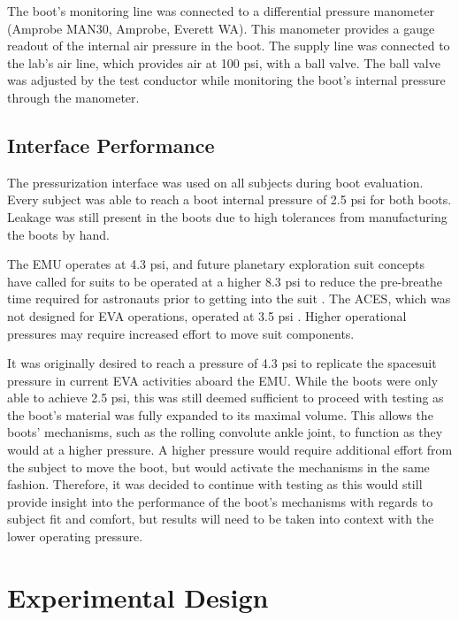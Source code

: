 \documentclass[defaultstyle,11pt]{thesis}
\begin{document}
The boot's monitoring line was connected to a differential pressure manometer (Amprobe MAN30, Amprobe, Everett WA).
This manometer provides a gauge readout of the internal air pressure in the boot.
The supply line was connected to the lab's air line, which provides air at 100 psi, with a ball valve.
The ball valve was adjusted by the test conductor while monitoring the boot's internal pressure through the manometer.

\hypertarget{interface-performance}{%
\subsection{Interface Performance}\label{interface-performance}}

The pressurization interface was used on all subjects during boot evaluation.
Every subject was able to reach a boot internal pressure of 2.5 psi for both boots.
Leakage was still present in the boots due to high tolerances from manufacturing the boots by hand.

The EMU operates at 4.3 psi, and future planetary exploration suit concepts have called for suits to be operated at a higher 8.3 psi to reduce the pre-breathe time required for astronauts prior to getting into the suit \citep{Kosmo1988}.
The ACES, which was not designed for EVA operations, operated at 3.5 psi \citep{Thomas2012}.
Higher operational pressures may require increased effort to move suit components.

It was originally desired to reach a pressure of 4.3 psi to replicate the spacesuit pressure in current EVA activities aboard the EMU.
While the boots were only able to achieve 2.5 psi, this was still deemed sufficient to proceed with testing as the boot's material was fully expanded to its maximal volume.
This allows the boots' mechanisms, such as the rolling convolute ankle joint, to function as they would at a higher pressure.
A higher pressure would require additional effort from the subject to move the boot, but would activate the mechanisms in the same fashion.
Therefore, it was decided to continue with testing as this would still provide insight into the performance of the boot's mechanisms with regards to subject fit and comfort, but results will need to be taken into context with the lower operating pressure.

\hypertarget{experimental-design}{%
\section{Experimental Design}\label{experimental-design}}
\end{document}
